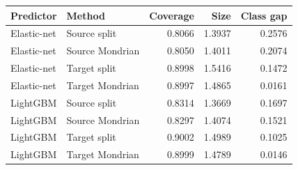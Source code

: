 \begin{tabular}{llrrr}
\toprule
Predictor & Method & Coverage & Size & Class gap \\
\midrule
Elastic-net & Source split & 0.8066 & 1.3937 & 0.2576 \\
Elastic-net & Source Mondrian & 0.8050 & 1.4011 & 0.2074 \\
Elastic-net & Target split & 0.8998 & 1.5416 & 0.1472 \\
Elastic-net & Target Mondrian & 0.8997 & 1.4865 & 0.0161 \\
LightGBM & Source split & 0.8314 & 1.3669 & 0.1697 \\
LightGBM & Source Mondrian & 0.8297 & 1.4074 & 0.1521 \\
LightGBM & Target split & 0.9002 & 1.4989 & 0.1025 \\
LightGBM & Target Mondrian & 0.8999 & 1.4789 & 0.0146 \\
\bottomrule
\end{tabular}
